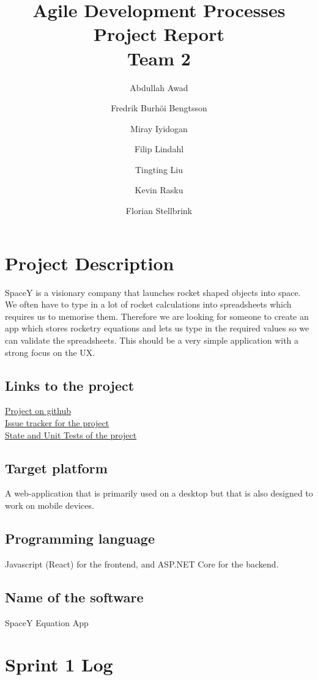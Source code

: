 \documentclass[14]{article}
\begin{document}
\noindent 
\title{Agile Development Processes Project Report\\
Team 2}
\author{Abdullah Awad \and Fredrik Burhöi Bengtsson \and Miray Iyidogan \and Filip Lindahl \and Tingting Liu \and Kevin Rasku \and Florian Stellbrink}

\section{Project Description}
SpaceY is a visionary company that launches rocket shaped objects into space. We often have to type in a lot of rocket calculations into spreadsheets which requires us to memorise them. Therefore we are looking for someone to create an app which stores rocketry equations and lets us type in the required values so we can validate the spreadsheets. This should be a very simple application with a strong focus on the UX.

\subsection{Links to the project}
\href{https://github.com/Owlinated/adp_project}{Project on github} \\
\href{https://github.com/Owlinated/adp_project/projects/1}{Issue tracker for the project} \\
\href{https://adp-spacey.herokuapp.com/}{State and Unit Tests of the project}

\subsection{Target platform}
A web-application that is primarily used on a desktop but that is also designed to work on mobile devices.

\subsection{Programming language}
Javascript (React) for the frontend, and ASP.NET Core for the backend.

\subsection{Name of the software}
SpaceY Equation App
\section{Sprint 1 Log}
\end{document}
